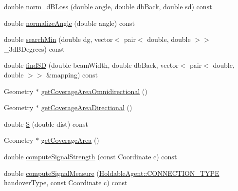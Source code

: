 \begin{DoxyCompactItemize}
double \hyperlink{class_antenna_a8270b1a03b61af1e048650e00a129b93}{norm\+\_\+d\+B\+Loss} (double angle, double db\+Back, double sd) const
\item 
double \hyperlink{class_antenna_a353ae3aafbc75033c30fb96004c2b73f}{normalize\+Angle} (double angle) const
\item 
double \hyperlink{class_antenna_a48ef89b0d1bd313bae4ca863da1cc77e}{search\+Min} (double dg, vector$<$ pair$<$ double, double $>$$>$ \+\_\+3d\+B\+Degrees) const
\item 
double \hyperlink{class_antenna_affb34fcbb958e09bd48a2c3069e06ac8}{find\+SD} (double beam\+Width, double db\+Back, vector$<$ pair$<$ double, double $>$$>$ \&mapping) const
\item 
Geometry $\ast$ \hyperlink{class_antenna_adaca77948cf68db3348e2819264767f6}{get\+Coverage\+Area\+Omnidirectional} ()
\item 
Geometry $\ast$ \hyperlink{class_antenna_af5e3d353fcc340b963181514b55bf715}{get\+Coverage\+Area\+Directional} ()
\item 
double \hyperlink{class_antenna_a5715c4100035c58d63b7c9a0195748fe}{S} (double dist) const
\item 
Geometry $\ast$ \hyperlink{class_antenna_a5f94dd903add1b59957514887388bd52}{get\+Coverage\+Area} ()
\item 
double \hyperlink{class_antenna_ac33fe5654d4e3307a4c1c155b0f89128}{compute\+Signal\+Strength} (const Coordinate c) const
\item 
double \hyperlink{class_antenna_a2fab50e7dbe01acec58d7fe89798e9b6}{compute\+Signal\+Measure} (\hyperlink{class_holdable_agent_ae2c334b004d7b9c5a999cf2618e4e518}{Holdable\+Agent\+::\+C\+O\+N\+N\+E\+C\+T\+I\+O\+N\+\_\+\+T\+Y\+PE} handover\+Type, const Coordinate c) const
\end{DoxyCompactItemize}
